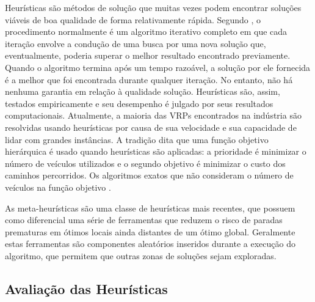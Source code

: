 Heurísticas são métodos de solução que muitas vezes podem encontrar soluções viáveis de boa qualidade de forma relativamente rápida. Segundo \cite{hillier05}, o procedimento normalmente é um algoritmo iterativo completo em que cada iteração envolve a condução de uma busca por uma nova solução que, eventualmente, poderia superar o melhor resultado encontrado previamente. Quando o algoritmo termina após um tempo razoável, a solução por ele fornecida é a melhor que foi encontrada durante qualquer iteração. No entanto, não há nenhuma garantia em relação à qualidade solução. Heurísticas são, assim, testados empiricamente e seu desempenho é julgado por seus resultados computacionais. Atualmente, a maioria das VRPs encontrados na indústria são resolvidas usando heurísticas por causa de sua velocidade e sua capacidade de lidar com grandes instâncias. A tradição dita que uma função objetivo hierárquica é usado quando heurísticas são aplicadas: a prioridade é minimizar o número de veículos utilizados e o segundo objetivo é minimizar o custo dos caminhos percorridos. Os algoritmos exatos que não consideram o número de veículos na função objetivo \cite{braysy05}.

As meta-heurísticas são uma classe de heurísticas mais recentes, que possuem como diferencial uma série de ferramentas que reduzem o risco de paradas prematuras em ótimos locais ainda distantes de um ótimo global. Geralmente estas ferramentas são componentes aleatórios inseridos durante a execução do algoritmo, que permitem que outras zonas de soluções sejam exploradas.

\subsection{Avaliação das Heurísticas }


